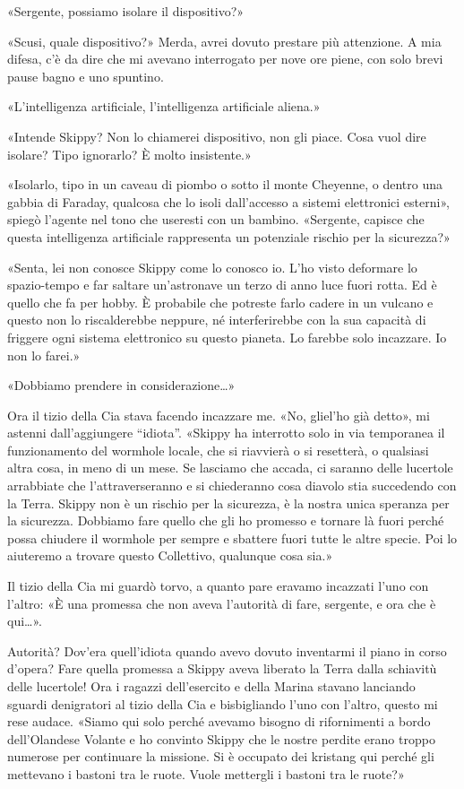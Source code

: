 «Sergente, possiamo isolare il dispositivo?»

«Scusi, quale dispositivo?» Merda, avrei dovuto prestare più attenzione.
A mia difesa, c'è da dire che mi avevano interrogato per nove ore piene,
con solo brevi pause bagno e uno spuntino.

«L'intelligenza artificiale, l'intelligenza artificiale aliena.»

«Intende Skippy? Non lo chiamerei dispositivo, non gli piace. Cosa vuol
dire isolare? Tipo ignorarlo? È molto insistente.»

«Isolarlo, tipo in un caveau di piombo o sotto il monte Cheyenne, o
dentro una gabbia di Faraday, qualcosa che lo isoli dall'accesso a
sistemi elettronici esterni», spiegò l'agente nel tono che useresti con
un bambino. «Sergente, capisce che questa intelligenza artificiale
rappresenta un potenziale rischio per la sicurezza?»

«Senta, lei non conosce Skippy come lo conosco io. L'ho visto deformare
lo spazio-tempo e far saltare un'astronave un terzo di anno luce fuori
rotta. Ed è quello che fa per hobby. È probabile che potreste farlo
cadere in un vulcano e questo non lo riscalderebbe neppure, né
interferirebbe con la sua capacità di friggere ogni sistema elettronico
su questo pianeta. Lo farebbe solo incazzare. Io non lo farei.»

«Dobbiamo prendere in considerazione\ldots»

Ora il tizio della Cia stava facendo incazzare me. «No, gliel'ho già
detto», mi astenni dall'aggiungere ``idiota''. «Skippy ha interrotto
solo in via temporanea il funzionamento del wormhole locale, che si
riavvierà o si resetterà, o qualsiasi altra cosa, in meno di un mese. Se
lasciamo che accada, ci saranno delle lucertole arrabbiate che
l'attraverseranno e si chiederanno cosa diavolo stia succedendo con la
Terra. Skippy non è un rischio per la sicurezza, è la nostra unica
speranza per la sicurezza. Dobbiamo fare quello che gli ho promesso e
tornare là fuori perché possa chiudere il wormhole per sempre e sbattere
fuori tutte le altre specie. Poi lo aiuteremo a trovare questo
Collettivo, qualunque cosa sia.»

Il tizio della Cia mi guardò torvo, a quanto pare eravamo incazzati
l'uno con l'altro: «È una promessa che non aveva l'autorità di fare,
sergente, e ora che è qui\ldots».

Autorità? Dov'era quell'idiota quando avevo dovuto inventarmi il piano
in corso d'opera? Fare quella promessa a Skippy aveva liberato la Terra
dalla schiavitù delle lucertole! Ora i ragazzi dell'esercito e della
Marina stavano lanciando sguardi denigratori al tizio della Cia e
bisbigliando l'uno con l'altro, questo mi rese audace. «Siamo qui solo
perché avevamo bisogno di rifornimenti a bordo dell'Olandese Volante e
ho convinto Skippy che le nostre perdite erano troppo numerose per
continuare la missione. Si è occupato dei kristang qui perché gli
mettevano i bastoni tra le ruote. Vuole mettergli i bastoni tra le
ruote?»

